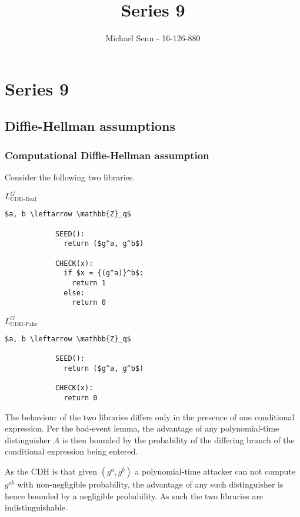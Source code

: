 \documentclass[a4paper]{scrreprt}
\title{Series 9}
\author{Michael Senn \maillink{michael.senn@students.unibe.ch} - 16-126-880}
\date{\printdate}
\begin{document}
\maketitle


\setcounter{chapter}{8}
\chapter{Series 9}

\section{Diffie-Hellman assumptions}

\subsection{Computational Diffie-Hellman assumption}

Consider the following two libraries.

\begin{tcbraster}[raster columns=2,raster equal height,nobeforeafter,raster column skip=2cm]
	\begin{library}{$L^{G}_{\text{CDH-Real}}$}
		\begin{lstlisting}[mathescape=true,autogobble=true]
			$a, b \leftarrow \mathbb{Z}_q$

			SEED():
			  return ($g^a, g^b$)

			CHECK(x):
			  if $x = {(g^a)}^b$:
			    return 1
			  else:
			    return 0
		\end{lstlisting}
	\end{library}
	\begin{library}{$L^{G}_{\text{CDH-Fake}}$}
		\begin{lstlisting}[mathescape=true,autogobble=true]
			$a, b \leftarrow \mathbb{Z}_q$

			SEED():
			  return ($g^a, g^b$)

			CHECK(x):
			  return 0
		\end{lstlisting}
	\end{library}
\end{tcbraster}

The behaviour of the two libraries differs only in the presence of one
conditional expression. Per the bad-event lemma, the advantage of any
polynomial-time distinguisher $A$ is then bounded by the probability of the
differing branch of the conditional expression being entered.

As the CDH is that given $(g^a, g^b)$ a polynomial-time attacker can not compute
$g^{ab}$ with non-negligible probability, the advantage of any such
distinguisher is hence bounded by a negligible probability. As such the two
libraries are indistinguishable.
\end{document}
